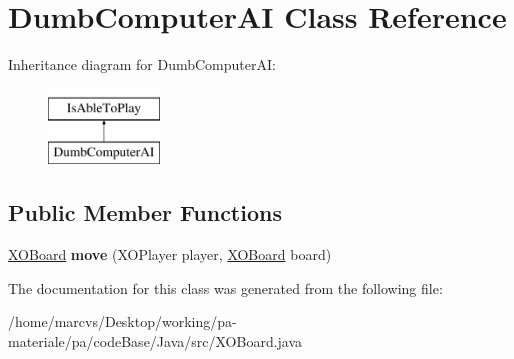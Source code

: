 \hypertarget{classDumbComputerAI}{
\section{DumbComputerAI Class Reference}
\label{classDumbComputerAI}
}
Inheritance diagram for DumbComputerAI:\begin{figure}[H]
\begin{center}
\leavevmode
\includegraphics[height=2.000000cm]{classDumbComputerAI}
\end{center}
\end{figure}
\subsection*{Public Member Functions}
\begin{DoxyCompactItemize}
\item 
\hypertarget{classDumbComputerAI_a7cb655ff976f568d859d7f87abf9d36a}{
\hyperlink{classXOBoard}{XOBoard} {\bfseries move} (XOPlayer player, \hyperlink{classXOBoard}{XOBoard} board)}
\label{classDumbComputerAI_a7cb655ff976f568d859d7f87abf9d36a}

\end{DoxyCompactItemize}


The documentation for this class was generated from the following file:\begin{DoxyCompactItemize}
\item 
/home/marcvs/Desktop/working/pa-\/materiale/pa/codeBase/Java/src/XOBoard.java\end{DoxyCompactItemize}
